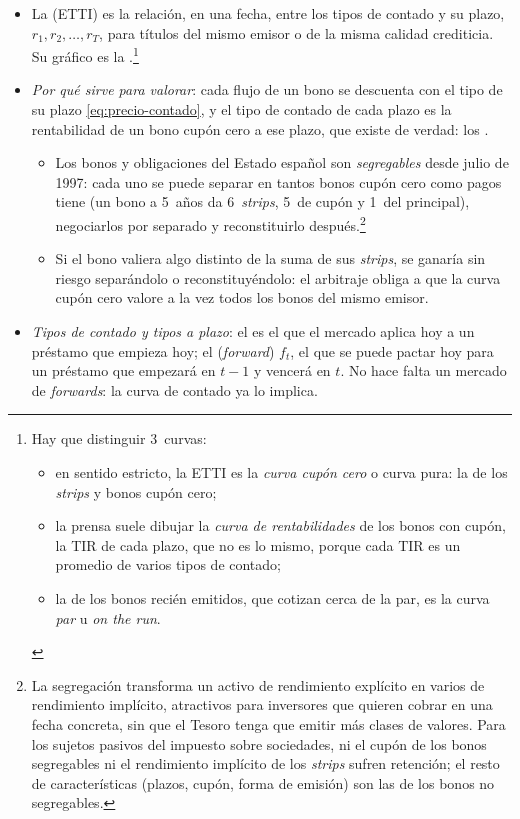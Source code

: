\documentclass[11pt]{article}
\begin{document}
\begin{itemize}
\item La  (ETTI) es la relación, en una fecha, entre los tipos de contado y su plazo, $r_1, r_2, \dots, r_T$, para títulos del mismo emisor o de la misma calidad crediticia. Su gráfico es la .\footnote{Hay que distinguir 3~curvas:
\begin{itemize}
\item en sentido estricto, la ETTI es la \emph{curva cupón cero} o curva pura: la de los \emph{strips} y bonos cupón cero;
\item la prensa suele dibujar la \emph{curva de rentabilidades} de los bonos con cupón, la TIR de cada plazo, que no es lo mismo, porque cada TIR es un promedio de varios tipos de contado;
\item la de los bonos recién emitidos, que cotizan cerca de la par, es la curva \emph{par} u \emph{on the run}.
\end{itemize}}
\item \emph{Por qué sirve para valorar}: cada flujo de un bono se descuenta con el tipo de su plazo \eqref{eq:precio-contado}, y el tipo de contado de cada plazo es la rentabilidad de un bono cupón cero a ese plazo, que existe de verdad: los .
  \begin{itemize}
  \item Los bonos y obligaciones del Estado español son \emph{segregables} desde julio de 1997: cada uno se puede separar en tantos bonos cupón cero como pagos tiene (un bono a 5~años da 6~\emph{strips}, 5~de cupón y 1~del principal), negociarlos por separado y reconstituirlo después.\footnote{La segregación transforma un activo de rendimiento explícito en varios de rendimiento implícito, atractivos para inversores que quieren cobrar en una fecha concreta, sin que el Tesoro tenga que emitir más clases de valores. Para los sujetos pasivos del impuesto sobre sociedades, ni el cupón de los bonos segregables ni el rendimiento implícito de los \emph{strips} sufren retención; el resto de características (plazos, cupón, forma de emisión) son las de los bonos no segregables\nocite{Tesoro2026Strips}.}
  \item Si el bono valiera algo distinto de la suma de sus \emph{strips}, se ganaría sin riesgo separándolo o reconstituyéndolo: el arbitraje obliga a que la curva cupón cero valore a la vez todos los bonos del mismo emisor.
  \end{itemize}
\item \emph{Tipos de contado y tipos a plazo}: el  es el que el mercado aplica hoy a un préstamo que empieza hoy; el  (\emph{forward}) $f_t$, el que se puede pactar hoy para un préstamo que empezará en $t-1$ y vencerá en $t$. No hace falta un mercado de \emph{forwards}: la curva de contado ya lo implica.

\end{itemize}
\end{document}
